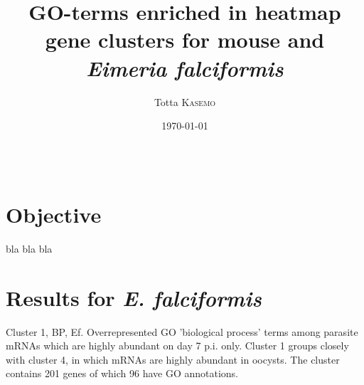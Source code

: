 \documentclass{article}
\title{GO-terms enriched in heatmap gene clusters for mouse and \textit{Eimeria falciformis}} %
\author{Totta \textsc{Kasemo}} %
\date{\today} %
\begin{document}
\maketitle %

\begin{center}
\begin{tabular}{l r}
\end{tabular}
\end{center}



\section{Objective}
bla bla bla
\newpage


\section{Results for \textit{E. falciformis}}
Cluster 1, BP, Ef.
Overrepresented GO 'biological process' terms among parasite mRNAs which are 
highly abundant on day 7 p.i. only. Cluster 1 groups closely with cluster 4,
in which mRNAs are highly abundant in oocysts. The cluster contains 201 genes of which 
96 have GO annotations.\\
\end{document}
